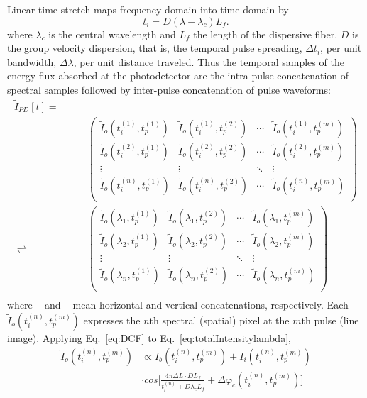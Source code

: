 \documentclass[aps,pra,reprint,longbibliography,superscriptaddress]{revtex4-1}
\DeclareMathOperator{\vercat}{cat_\downarrow} %
\DeclareMathOperator{\horcat}{cat_\rightarrow} %
\begin{document}
Linear time stretch maps frequency domain into time domain by
\begin{equation} \label{eq:DCF}
t_i = D (\lambda - \lambda_c) L_f.
\end{equation}
where $\lambda_c$ is the central wavelength and $L_f$ the length of the dispersive fiber. $D$ is the group velocity dispersion, that is, the temporal pulse spreading, $\Delta t_i$, per unit bandwidth, $\Delta\lambda$, per unit distance traveled. Thus the temporal samples of the energy flux absorbed at the photodetector are the intra-pulse concatenation of spectral samples followed by inter-pulse concatenation of pulse waveforms:
\begin{equation}
\begin{split}
\tilde{I}_{PD}[t] = \quad\quad&\quad\\
\horcat\vercat &
\begin{pmatrix}
\tilde{I}_{o}(t_i^{(1)}, t_p^{(1)})&	\tilde{I}_{o}(t_i^{(1)}, t_p^{(2)})&	\cdots& \tilde{I}_{o}(t_i^{(1)}, t_p^{(m)})\\
\tilde{I}_{o}(t_i^{(2)}, t_p^{(1)})&	\tilde{I}_{o}(t_i^{(2)}, t_p^{(2)})&	\cdots& \tilde{I}_{o}(t_i^{(2)}, t_p^{(m)})\\
\vdots&									\vdots&									\ddots& \vdots								 \\
\tilde{I}_{o}(t_i^{(n)}, t_p^{(1)})&	\tilde{I}_{o}(t_i^{(n)}, t_p^{(2)})&	\cdots& \tilde{I}_{o}(t_i^{(n)}, t_p^{(m)})\\
\end{pmatrix} \\
\rightleftharpoons \horcat\vercat &
\begin{pmatrix}
\tilde{I}_{o}(\lambda_1, t_p^{(1)})  &\tilde{I}_{o}(\lambda_1, t_p^{(2)})   &\cdots  &\tilde{I}_{o}(\lambda_1, t_p^{(m)})\\
\tilde{I}_{o}(\lambda_2, t_p^{(1)})  &\tilde{I}_{o}(\lambda_2, t_p^{(2)})   &\cdots  &\tilde{I}_{o}(\lambda_2, t_p^{(m)})\\
\vdots						   		 &\vdots							    	&\ddots  &\vdots					 \\
\tilde{I}_{o}(\lambda_n, t_p^{(1)})  &\tilde{I}_{o}(\lambda_n, t_p^{(2)})   &\cdots  &\tilde{I}_{o}(\lambda_n, t_p^{(m)})\\
\end{pmatrix} \\
\end{split}
\end{equation}
where $\horcat$ and $\vercat$ mean horizontal and vertical concatenations, respectively. Each $\tilde{I}_{o}(t_i^{(n)}, t_p^{(m)})$ expresses the $n$th spectral (spatial) pixel at the $m$th pulse (line image). Applying Eq.~\ref{eq:DCF} to Eq.~\ref{eq:totalIntensitylambda},
\begin{equation}\label{eq:afterDCF}
\begin{split}
\tilde{I}_{o}(t_i^{(n)}, t_p^{(m)}) & \propto I_b (t_i^{(n)}, t_p^{(m)}) + I_i (t_i^{(n)}, t_p^{(m)}) \\
& \cdot cos\Bigg[ \frac{4\pi\Delta L \cdot D L_f}{t_i^{(n)} + D\lambda_c L_f} + \Delta \varphi_c(t_i^{(n)}, t_p^{(m)}) \Bigg]
\end{split}
\end{equation}
\end{document}
